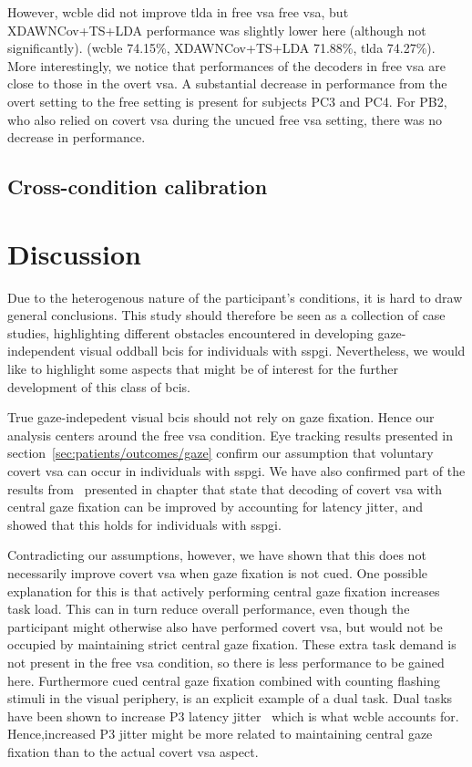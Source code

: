 However, \Ac{wcble} did not improve \ac{tlda} in free \ac{vsa} free \ac{vsa}, but
XDAWNCov+TS+LDA performance was slightly lower here (although not
significantly).
(\ac{wcble} 74.15\%, XDAWNCov+TS+LDA 71.88\%, \ac{tlda} 74.27\%).
More interestingly, we notice that performances of the decoders in free
\ac{vsa} are close to those in the overt \ac{vsa}.
A substantial decrease in performance from the overt setting to the free
setting is present for
subjects PC3 and PC4.
For PB2, who also relied on covert \ac{vsa} during the uncued free \ac{vsa}
setting, there was no decrease in performance.

\subsection{Cross-condition calibration}
\label{sec:patients/outcomes/cross}


\section{Discussion}

Due to the heterogenous nature of the participant's conditions, it is hard to
draw general conclusions.
This study should therefore be seen as a collection of case studies,
highlighting different obstacles encountered in developing gaze-independent
visual oddball \acp{bci} for individuals with \ac{sspgi}.
Nevertheless, we would like to highlight some aspects that might be
of interest for the further development of this class of \acp{bci}.

True gaze-indepedent visual \acp{bci} should not rely on gaze fixation.
Hence our analysis centers around the free \ac{vsa} condition.
Eye tracking results presented in section~\ref{sec:patients/outcomes/gaze}
confirm our assumption that voluntary covert \ac{vsa} can
occur in individuals with \ac{sspgi}.
We have also confirmed part of the results from~\textcite{VanDenKerchove2024} presented in
chapter that state that decoding of covert \ac{vsa} with central gaze
fixation can be improved by accounting for latency jitter, and showed that this
holds for individuals with \ac{sspgi}.

Contradicting our assumptions, however, we have shown that this does not
necessarily improve covert \ac{vsa} when gaze fixation is not cued.
One possible explanation for this is that actively performing central gaze fixation
increases task load.
This can in turn reduce overall performance, even though the participant might
otherwise also have performed covert \ac{vsa}, but would not be occupied by
maintaining strict central gaze fixation.
These extra task demand is not present in the free \ac{vsa} condition, so
there is less performance to be gained here.
Furthermore cued central gaze fixation combined with counting flashing stimuli
in the visual periphery, is an explicit example of a dual task.
Dual tasks have been shown to increase P3 latency
jitter~\cite{Polich2007,Arico2014, VanDenKerchove2024}
which is what \ac{wcble} accounts for.
Hence,increased P3 jitter might be more related to maintaining central gaze fixation
than to the actual covert \ac{vsa} aspect.

